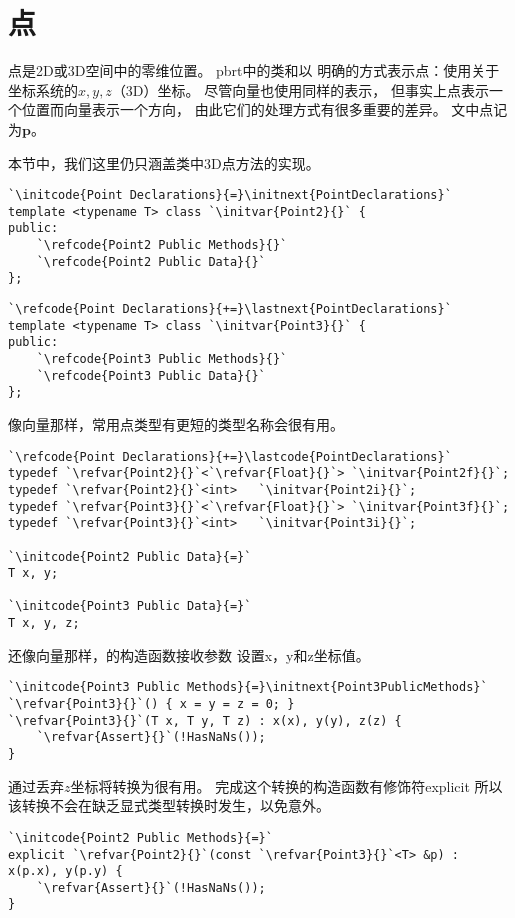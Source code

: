 \section{点}\label{sec:点}

点是2D或3D空间中的零维位置。
pbrt中的类和以
明确的方式表示点：使用关于坐标系统的$x,y,z$（3D）坐标。
尽管向量也使用同样的表示，
但事实上点表示一个位置而向量表示一个方向，
由此它们的处理方式有很多重要的差异。
文中点记为$\bm p$。

本节中，我们这里仍只涵盖类中3D点方法的实现。
\begin{lstlisting}
`\initcode{Point Declarations}{=}\initnext{PointDeclarations}`
template <typename T> class `\initvar{Point2}{}` {
public:
    `\refcode{Point2 Public Methods}{}`
    `\refcode{Point2 Public Data}{}`
};
\end{lstlisting}

\begin{lstlisting}
`\refcode{Point Declarations}{+=}\lastnext{PointDeclarations}`
template <typename T> class `\initvar{Point3}{}` {
public:
    `\refcode{Point3 Public Methods}{}`
    `\refcode{Point3 Public Data}{}`
};
\end{lstlisting}

像向量那样，常用点类型有更短的类型名称会很有用。
\begin{lstlisting}
`\refcode{Point Declarations}{+=}\lastcode{PointDeclarations}`
typedef `\refvar{Point2}{}`<`\refvar{Float}{}`> `\initvar{Point2f}{}`;
typedef `\refvar{Point2}{}`<int>   `\initvar{Point2i}{}`;
typedef `\refvar{Point3}{}`<`\refvar{Float}{}`> `\initvar{Point3f}{}`;
typedef `\refvar{Point3}{}`<int>   `\initvar{Point3i}{}`;

`\initcode{Point2 Public Data}{=}`
T x, y;

`\initcode{Point3 Public Data}{=}`
T x, y, z;
\end{lstlisting}

还像向量那样，的构造函数接收参数
设置{\ttfamily x}，{\ttfamily y}和{\ttfamily z}坐标值。
\begin{lstlisting}
`\initcode{Point3 Public Methods}{=}\initnext{Point3PublicMethods}`
`\refvar{Point3}{}`() { x = y = z = 0; }
`\refvar{Point3}{}`(T x, T y, T z) : x(x), y(y), z(z) {
    `\refvar{Assert}{}`(!HasNaNs());
}
\end{lstlisting}

通过丢弃$z$坐标将转换为很有用。
完成这个转换的构造函数有修饰符{\ttfamily explicit}
所以该转换不会在缺乏显式类型转换时发生，以免意外。
\begin{lstlisting}
`\initcode{Point2 Public Methods}{=}`
explicit `\refvar{Point2}{}`(const `\refvar{Point3}{}`<T> &p) : x(p.x), y(p.y) {
    `\refvar{Assert}{}`(!HasNaNs());
}
\end{lstlisting}

